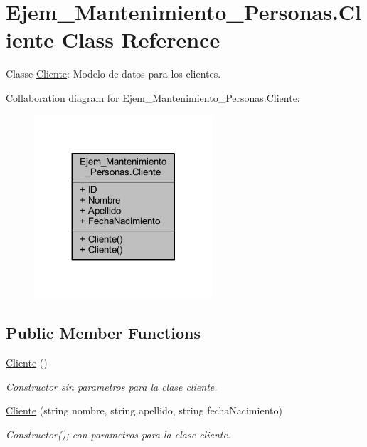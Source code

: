 \hypertarget{class_ejem___mantenimiento___personas_1_1_cliente}{}\section{Ejem\+\_\+\+Mantenimiento\+\_\+\+Personas.\+Cliente Class Reference}
\label{class_ejem___mantenimiento___personas_1_1_cliente}


Classe \mbox{\hyperlink{class_ejem___mantenimiento___personas_1_1_cliente}{Cliente}}\+: Modelo de datos para los clientes.  




Collaboration diagram for Ejem\+\_\+\+Mantenimiento\+\_\+\+Personas.\+Cliente\+:
\nopagebreak
\begin{figure}[H]
\begin{center}
\leavevmode
\includegraphics[width=188pt]{class_ejem___mantenimiento___personas_1_1_cliente__coll__graph}
\end{center}
\end{figure}
\subsection*{Public Member Functions}
\begin{DoxyCompactItemize}
\item 
\mbox{\hyperlink{class_ejem___mantenimiento___personas_1_1_cliente_a6df93124462da1bb67a5274db3d7a2d4}{Cliente}} ()
\begin{DoxyCompactList}\small\item\em Constructor sin parametros para la clase cliente. \end{DoxyCompactList}\item 
\mbox{\hyperlink{class_ejem___mantenimiento___personas_1_1_cliente_aa963edf25ca30a5fd262340cb3046d61}{Cliente}} (string nombre, string apellido, string fecha\+Nacimiento)
\begin{DoxyCompactList}\small\item\em Constructor(); con parametros para la clase cliente. \end{DoxyCompactList}\end{DoxyCompactItemize}
